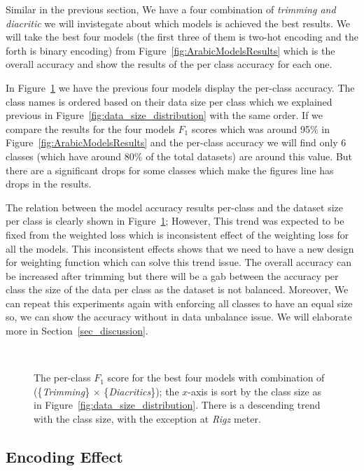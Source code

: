 Similar in the previous section, We have a four combination of \textit{trimming and diacritic} we will invistegate about which models is achieved the best results. We will take the best four models (the first three of them is two-hot encoding and the forth is binary encoding) from Figure~\ref{fig:ArabicModelsResults} which is the overall accuracy and show the results of the per class accuracy for each one.

In Figure~\ref{fig:Results_Per_Class} we have the previous four models display the per-class accuracy. The class names is ordered based on their data size per class which we explained previous in Figure~\ref{fig:data_size_distribution} with the same order. If we compare the results for the four models $F_1$ scores which was around 95\% in Figure~\ref{fig:ArabicModelsResults} and the per-class accuracy we will find only 6 classes (which have around 80\% of the total datasets) are around this value. But there are a significant drops for some classes which make the figures line has drops in the results.

The relation between the model accuracy results per-class and the dataset size per class is clearly shown in Figure~\ref{fig:Results_Per_Class}; However, This trend was expected to be fixed from the weighted loss which is inconsistent effect of the weighting loss for all the models. This inconsistent effects shows that we need to have a new design for weighting function which can solve this trend issue. The overall accuracy can be increased after trimming but there will be a gab between the accuracy per class the size of the data per class as the dataset is not balanced. Moreover, We can repeat this experiments again with enforcing all classes to have an equal size so, we can show the accuracy without in data unbalance issue. We will elaborate more in Section~\ref{sec_discussion}.



\begin{figure}
 
 \caption{The per-class $F_1$ score for the best four models with combination of (\{\textit{Trimming}\} $\times$ \{\textit{Diacritics}\}); the $x$-axis is sort by the class size as in Figure~\ref{fig:data_size_distribution}. There is a descending trend with the class size, with the exception at \textit{Rigz} meter.}~\label{fig:Results_Per_Class}
\end{figure}



\subsection{Encoding Effect}

